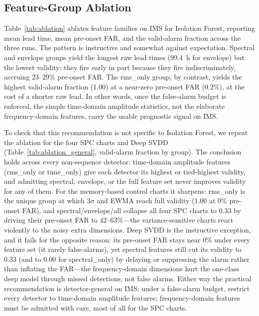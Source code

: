 \documentclass[IJPHM, 2026, 0]{PHMSociety}
\begin{document}
\subsection{Feature-Group Ablation}
Table~\ref{tab:ablation} ablates feature families on IMS for Isolation Forest, reporting mean lead time, mean pre-onset FAR, and the valid-alarm fraction across the three runs. The pattern is instructive and somewhat against expectation. Spectral and envelope groups yield the longest raw lead times (99.4~h for envelope) but the lowest validity: they fire early in part because they fire indiscriminately, accruing 23--29\% pre-onset FAR. The rms\_only group, by contrast, yields the highest valid-alarm fraction (1.00) at a near-zero pre-onset FAR (0.2\%), at the cost of a shorter raw lead. In other words, once the false-alarm budget is enforced, the simple time-domain amplitude statistics, not the elaborate frequency-domain features, carry the usable prognostic signal on IMS.

To check that this recommendation is not specific to Isolation Forest, we repeat the ablation for the four SPC charts and Deep SVDD (Table~\ref{tab:ablation_general}, valid-alarm fraction by group). The conclusion holds across every non-sequence detector: time-domain amplitude features (rms\_only or time\_only) give each detector its highest or tied-highest validity, and admitting spectral, envelope, or the full feature set never improves validity for any of them. For the memory-based control charts it sharpens: rms\_only is the unique group at which $3\sigma$ and EWMA reach full validity (1.00 at 0\% pre-onset FAR), and spectral/envelope/all collapse all four SPC charts to 0.33 by driving their pre-onset FAR to 42--63\%---the variance-sensitive charts react violently to the noisy extra dimensions. Deep SVDD is the instructive exception, and it fails for the opposite reason: its pre-onset FAR stays near 0\% under every feature set (it rarely false-alarms), yet spectral features still cut its validity to 0.33 (and to 0.00 for spectral\_only) by delaying or suppressing the alarm rather than inflating the FAR---the frequency-domain dimensions hurt the one-class deep model through missed detections, not false alarms. Either way the practical recommendation is detector-general on IMS: under a false-alarm budget, restrict every detector to time-domain amplitude features; frequency-domain features must be admitted with care, most of all for the SPC charts.
\end{document}

